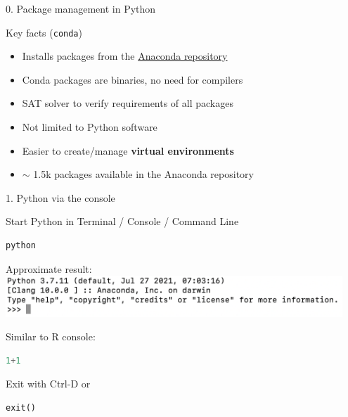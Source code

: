 
\begin{vbframe}{0. Package management in Python}

\vfill

Key facts (\texttt{conda})

\begin{itemize}
		\item Installs packages from the \href{https://repo.anaconda.com/}{Anaconda repository}
		\item Conda packages are binaries, no need for compilers
		\item SAT solver to verify requirements of all packages
		\item Not limited to Python software
		\item Easier to create/manage \textbf{virtual environments}
		\item $\sim$ 1.5k packages available in the Anaconda repository
\end{itemize}

\vfill

\end{vbframe}


\begin{vbframe}{1. Python via the console}

\vfill

Start Python in Terminal / Console / Command Line
\vspace{-.2cm}
\begin{lstlisting}[language=bash]
python
\end{lstlisting}

Approximate result:\\

\includegraphics[width=0.95\textwidth]{figure/python_terminal.png}

Similar to R console:
\vspace{-.2cm}
\begin{lstlisting}[language=python]
1+1
\end{lstlisting}

Exit with Ctrl-D or
\vspace{-.2cm}
\begin{lstlisting}[language=python]
exit()
\end{lstlisting}

\vfill

\end{vbframe}

